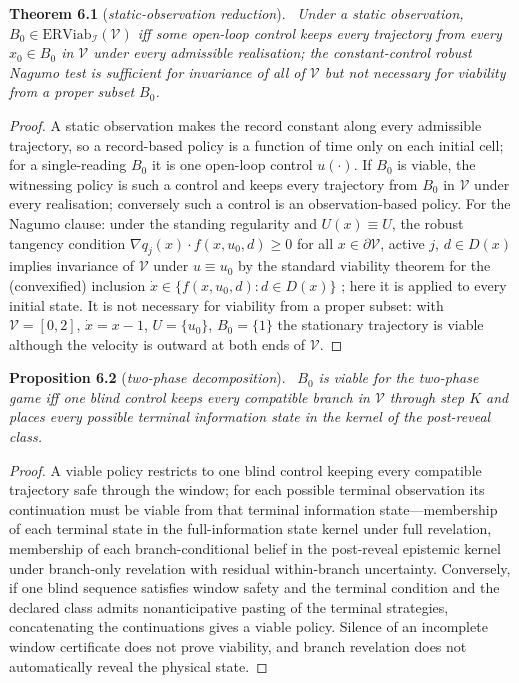 \documentclass[11pt,a4paper]{article}
\theoremstyle{plain}
\theoremstyle{definition}
\theoremstyle{remark}
\newenvironment{restated}[2]{\par\medskip\noindent\textbf{#1} (\textit{#2}).\ \itshape}{\par\medskip}
\newcommand{\ERViab}{\mathrm{ERViab}}
\newcommand{\cV}{\mathcal{V}}
\newcommand{\cI}{\mathcal{I}}
\begin{document}
\begin{restated}{Theorem 6.1}{static-observation reduction}
Under a static observation, $B_0\in\ERViab_\cI(\cV)$ iff some open-loop control keeps every trajectory from every $x_0\in B_0$ in $\cV$ under every admissible realisation; the constant-control robust Nagumo test is sufficient for invariance of all of $\cV$ but not necessary for viability from a proper subset $B_0$.
\end{restated}

\begin{proof}
A static observation makes the record constant along every admissible trajectory, so a record-based policy is a function of time only on each initial cell; for a single-reading $B_0$ it is one open-loop control $u(\cdot)$. If $B_0$ is viable, the witnessing policy is such a control and keeps every trajectory from $B_0$ in $\cV$ under every realisation; conversely such a control is an observation-based policy. For the Nagumo clause: under the standing regularity and $U(x)\equiv U$, the robust tangency condition $\nabla q_j(x)\cdot f(x,u_0,d)\ge0$ for all $x\in\partial\cV$, active $j$, $d\in D(x)$ implies invariance of $\cV$ under $u\equiv u_0$ by the standard viability theorem for the (convexified) inclusion $\dot x\in\{f(x,u_0,d):d\in D(x)\}$ \citep{nagumo1942,aubin1991}; here it is applied to every initial state. It is not necessary for viability from a proper subset: with $\cV=[0,2]$, $\dot x=x-1$, $U=\{u_0\}$, $B_0=\{1\}$ the stationary trajectory is viable although the velocity is outward at both ends of $\cV$.
\end{proof}

\begin{restated}{Proposition 6.2}{two-phase decomposition}
$B_0$ is viable for the two-phase game iff one blind control keeps every compatible branch in $\cV$ through step $K$ and places every possible terminal information state in the kernel of the post-reveal class.
\end{restated}

\begin{proof}
A viable policy restricts to one blind control keeping every compatible trajectory safe through the window; for each possible terminal observation its continuation must be viable from that terminal information state---membership of each terminal state in the full-information state kernel under full revelation, membership of each branch-conditional belief in the post-reveal epistemic kernel under branch-only revelation with residual within-branch uncertainty. Conversely, if one blind sequence satisfies window safety and the terminal condition and the declared class admits nonanticipative pasting of the terminal strategies, concatenating the continuations gives a viable policy. Silence of an incomplete window certificate does not prove viability, and branch revelation does not automatically reveal the physical state.
\end{proof}
\end{document}
